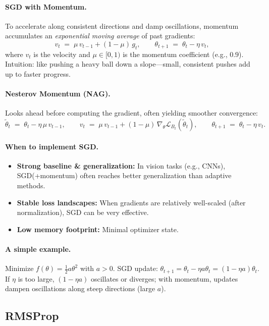 \documentclass[12pt,a4paper]{report}
\begin{document}
\paragraph{SGD with Momentum.}
To accelerate along consistent directions and damp oscillations, momentum accumulates an \textit{exponential moving average} of past gradients:
\[
v_{t} \;=\; \mu\, v_{t-1} + (1-\mu)\, g_t, \qquad
\theta_{t+1} \;=\; \theta_t - \eta\, v_t,
\]
where $v_t$ is the velocity and $\mu \in [0,1)$ is the momentum coefficient (e.g., $0.9$). 
Intuition: like pushing a heavy ball down a slope—small, consistent pushes add up to faster progress.

\paragraph{Nesterov Momentum (NAG).}
Looks ahead before computing the gradient, often yielding smoother convergence:
\[
\tilde{\theta}_t \;=\; \theta_t - \eta\, \mu\, v_{t-1}, \qquad
v_t \;=\; \mu\, v_{t-1} + (1-\mu)\, \nabla_{\theta}\mathcal{L}_{B_t}(\tilde{\theta}_t), \qquad
\theta_{t+1} \;=\; \theta_t - \eta\, v_t.
\]

\paragraph{When to implement SGD.}
\begin{itemize}
    \item \textbf{Strong baseline \& generalization:} In vision tasks (e.g., CNNs), SGD(+momentum) often reaches better generalization than adaptive methods.
    \item \textbf{Stable loss landscapes:} When gradients are relatively well-scaled (after normalization), SGD can be very effective.
    \item \textbf{Low memory footprint:} Minimal optimizer state.
\end{itemize}

\paragraph{A simple example.}
Minimize $f(\theta)=\tfrac{1}{2}a\theta^2$ with $a>0$. 
SGD update: $\theta_{t+1}=\theta_t-\eta a\theta_t=(1-\eta a)\theta_t$. 
If $\eta$ is too large, $(1-\eta a)$ oscillates or diverges; with momentum, updates dampen oscillations along steep directions (large $a$).

\vspace{1em}
\subsection{RMSProp}
\end{document}
